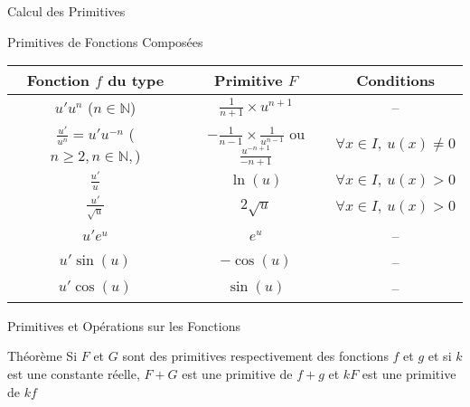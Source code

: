 \documentclass{cours}
\begin{document}
\begin{Gpartie}{Calcul des Primitives}
\begin{Spartie}{Primitives de Fonctions Composées}
            \begin{center}\begin{tabular}[c]{ |c|c|c| } \hline
                Fonction $f$ du type                                    & Primitive $F$                                                             & Conditions  \\ \hline\hline
                $u'u^n$ ($n\in\mathbb{N}$)                              & $\frac{1}{n+1}\times u^{n+1}$                                             & \---\\ \hline
                $\frac{u'}{u^n}=u'u^{-n}$ ($n\geq2, n\in\mathbb{N},$)   & $-\frac{1}{n-1}\times\frac{1}{u^{n-1}}$ ou $\frac{u^{-n+1}}{-n+1}$        & $\forall x\in I,\ u(x)\neq0$ \\ \hline
                $\frac{u'}{u}$                                          & $\ln(u)$                                                                  & $\forall x\in I,\ u(x)>0$ \\ \hline
                $\frac{u'}{\sqrt{u}}$                                   & $2\sqrt{u}$                                                               & $\forall x\in I,\ u(x)>0$ \\ \hline
                $u'e^u$                                                 & $e^u$                                                                     & \---\\ \hline
                $u'\sin(u)$                                             & $-\cos(u)$                                                                & \---\\ \hline
                $u'\cos(u)$                                             & $\sin(u)$                                                                 & \---\\ \hline
            \end{tabular}\end{center}
            \parbox{\linewidth}{}
        \end{Spartie}
        \pagebreak
        \begin{Spartie}{Primitives et Opérations sur les Fonctions} 
            \begin{SSpartie}{Théorème} 
                Si $F$ et $G$ sont des primitives respectivement des fonctions $f$ et $g$ et si $k$ est une constante réelle, $F+G$ est une primitive de $f+g$ et $kF$ est une primitive de $kf$
            \end{SSpartie}

\end{Spartie}
\end{Gpartie}
\end{document}
